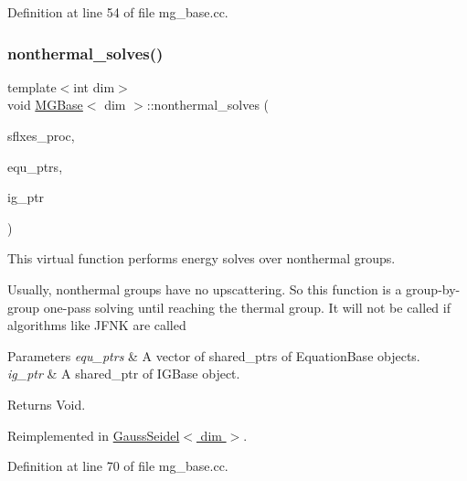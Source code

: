 Definition at line 54 of file mg\+\_\+base.\+cc.

\mbox{\label{class_m_g_base_a55ba9bef3616dd5eab9e3986f6e8e311}} 
\subsubsection{\texorpdfstring{nonthermal\+\_\+solves()}{nonthermal\_solves()}}
{\footnotesize\ttfamily template$<$int dim$>$ \\
void \hyperlink{class_m_g_base}{M\+G\+Base}$<$ dim $>$\+::nonthermal\+\_\+solves (\begin{DoxyParamCaption}\item[{std\+::vector$<$ Vector$<$ double $>$ $>$ \&}]{sflxes\+\_\+proc,  }\item[{std\+::vector$<$ std\+\_\+cxx11\+::shared\+\_\+ptr$<$ \hyperlink{class_equation_base}{Equation\+Base}$<$ dim $>$ $>$ $>$ \&}]{equ\+\_\+ptrs,  }\item[{std\+\_\+cxx11\+::shared\+\_\+ptr$<$ \hyperlink{class_i_g_base}{I\+G\+Base}$<$ dim $>$ $>$}]{ig\+\_\+ptr }\end{DoxyParamCaption})\hspace{0.3cm}{\ttfamily [virtual]}}

This virtual function performs energy solves over nonthermal groups.

Usually, nonthermal groups have no upscattering. So this function is a group-\/by-\/ group one-\/pass solving until reaching the thermal group. It will not be called if algorithms like J\+F\+NK are called


\begin{DoxyParams}{Parameters}
{\em equ\+\_\+ptrs} & A vector of shared\+\_\+ptr\textquotesingle{}s of Equation\+Base objects. \\
\hline
{\em ig\+\_\+ptr} & A shared\+\_\+ptr of I\+G\+Base object. \\
\hline
\end{DoxyParams}
\begin{DoxyReturn}{Returns}
Void. 
\end{DoxyReturn}


Reimplemented in \hyperlink{class_gauss_seidel_a28fc4ef9150773f587f90951c704c994}{Gauss\+Seidel$<$ dim $>$}.



Definition at line 70 of file mg\+\_\+base.\+cc.

